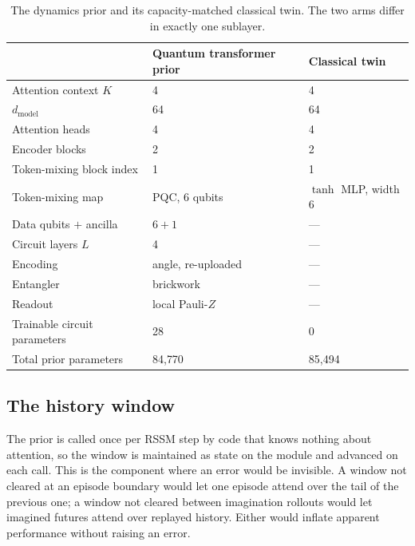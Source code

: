\documentclass[11pt,onecolumn]{article}
\begin{document}
\begin{table}[htb]\centering\small
\caption{The dynamics prior and its capacity-matched classical twin.
The two arms differ in exactly one sublayer.}
\label{tab:arch}
\begin{tabular}{lll}
\toprule
& Quantum transformer prior & Classical twin \\
\midrule
Attention context $K$          & 4                  & 4 \\
$d_{\mathrm{model}}$           & 64                 & 64 \\
Attention heads                & 4                  & 4 \\
Encoder blocks                 & 2                  & 2 \\
Token-mixing block index       & 1                  & 1 \\
Token-mixing map               & PQC, 6 qubits      & $\tanh$ MLP, width 6 \\
Data qubits $+$ ancilla        & $6 + 1$            & --- \\
Circuit layers $L$             & 4                  & --- \\
Encoding                       & angle, re-uploaded & --- \\
Entangler                      & brickwork          & --- \\
Readout                        & local Pauli-$Z$    & --- \\
\midrule
Trainable circuit parameters   & 28                 & 0 \\
Total prior parameters         & 84{,}770           & 85{,}494 \\
\bottomrule
\end{tabular}
\end{table}

\subsection{The history window}
The prior is called once per RSSM step by code that knows nothing about
attention, so the window is maintained as state on the module and
advanced on each call. This is the component where an error would be
invisible. A window not cleared at an episode boundary would let one
episode attend over the tail of the previous one; a window not cleared
between imagination rollouts would let imagined futures attend over
replayed history. Either would inflate apparent performance without
raising an error.
\end{document}
